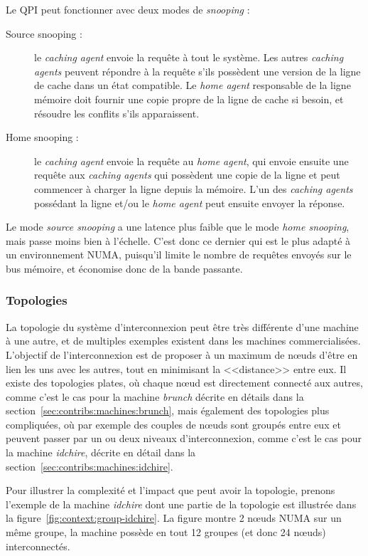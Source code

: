 Le QPI peut fonctionner avec deux modes de \emph{snooping} :
\begin{description}
  \item [Source snooping :] le \emph{caching agent} envoie la requête à tout le système. Les autres \emph{caching agents} peuvent répondre à la requête s'ils possèdent une version de la ligne de cache dans un état compatible. Le \emph{home agent} responsable de la ligne mémoire doit fournir une copie propre de la ligne de cache si besoin, et résoudre les conflits s'ils apparaissent.
  \item [Home snooping :] le \emph{caching agent} envoie la requête au \emph{home agent}, qui envoie ensuite une requête aux \emph{caching agents} qui possèdent une copie de la ligne et peut commencer à charger la ligne depuis la mémoire. L'un des \emph{caching agents} possédant la ligne et/ou le \emph{home agent} peut ensuite envoyer la réponse.
\end{description}

Le mode \emph{source snooping} a une latence plus faible que le mode \emph{home snooping}, mais passe moins bien à l'échelle.
C'est donc ce dernier qui est le plus adapté à un environnement NUMA, puisqu'il limite le nombre de requêtes envoyés sur le bus mémoire, et économise donc de la bande passante.


\subsubsection{Topologies}

La topologie du système d'interconnexion peut être très différente d'une machine à une autre, et de multiples exemples existent dans les machines commercialisées.
L'objectif de l'interconnexion est de proposer à un maximum de nœuds d'être en lien les uns avec les autres, tout en minimisant la <<distance>> entre eux.
Il existe des topologies plates, où chaque nœud est directement connecté aux autres, comme c'est le cas pour la machine \emph{brunch} décrite en détails dans la section~\ref{sec:contribs:machines:brunch}, mais également des topologies plus compliquées, où par exemple des couples de nœuds sont groupés entre eux et peuvent passer par un ou deux niveaux d'interconnexion, comme c'est le cas pour la machine \emph{idchire}, décrite en détail dans la section~\ref{sec:contribs:machines:idchire}.

Pour illustrer la complexité et l'impact que peut avoir la topologie, prenons l'exemple de la machine \emph{idchire} dont une partie de la topologie est illustrée dans la figure~\ref{fig:context:group-idchire}.
La figure montre 2 nœuds NUMA sur un même groupe, la machine possède en tout 12 groupes (et donc 24 nœuds) interconnectés.

